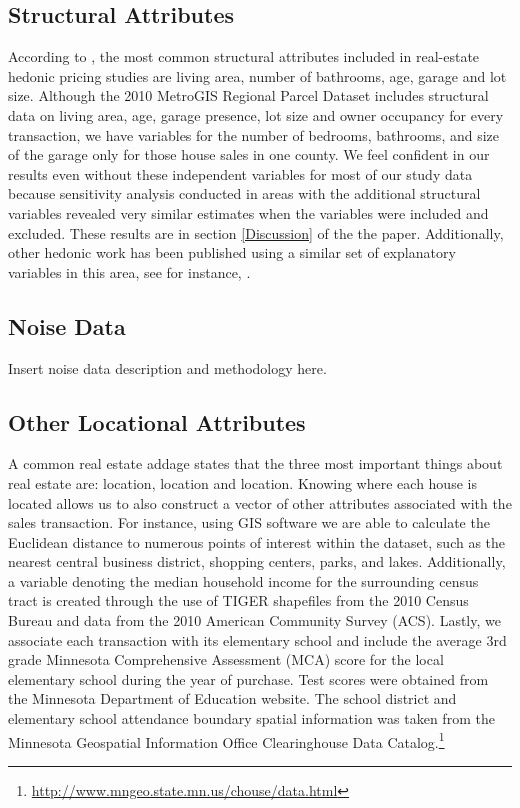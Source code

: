 \documentclass{article}\usepackage{graphicx, color}
\begin{document}
\subsection{Structural Attributes}
According to \cite{Wilhelmsson2000}, the most common structural attributes included in real-estate hedonic pricing studies are living area, number of bathrooms, age, garage and lot size.  Although the 2010 MetroGIS Regional Parcel Dataset includes structural data on living area, age, garage presence, lot size and owner occupancy for every transaction, we have variables for the number of bedrooms, bathrooms, and size of the garage only for those house sales in one county. We feel confident in our results even without these independent variables for most of our study data because sensitivity analysis conducted in areas with the additional structural variables revealed very similar estimates when the variables were included and excluded. These results are in section \ref{Discussion} of the the paper. Additionally, other hedonic work has been published using a similar set of explanatory variables in this area, see for instance, \citet{Sander2009b}.

\subsection{Noise Data}
Insert noise data description and methodology here. \citet{Nega2012}

\subsection{Other Locational Attributes}
A common real estate addage states that the three most important things about real estate are: location, location and location. Knowing where each house is located allows us to also construct a vector of other attributes associated with the sales transaction. For instance, using GIS software we are able to calculate the Euclidean distance to numerous points of interest within the dataset, such as the nearest central business district, shopping centers, parks, and lakes. Additionally, a variable denoting the median household income for the surrounding census tract is created through the use of TIGER shapefiles from the 2010 Census Bureau and data from the 2010 American Community Survey (ACS). Lastly, we associate each transaction with its elementary school and include the average 3rd grade Minnesota Comprehensive Assessment (MCA) score for the local elementary school during the year of purchase. Test scores were obtained from the Minnesota Department of Education website. The school district and elementary school attendance boundary spatial information was taken from the Minnesota Geospatial Information Office Clearinghouse Data Catalog.\footnote{\url{http://www.mngeo.state.mn.us/chouse/data.html}} 
\end{document}
